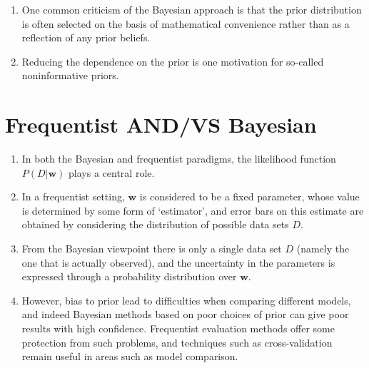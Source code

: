 \begin{enumerate}
    \item One common criticism of the Bayesian approach is that the prior distribution is often selected on the basis of mathematical convenience rather than as a reflection of any prior beliefs.
    \hfill \cite{ml/book/Pattern-Recognition-And-Machine-Learning/Christopher-M-Bishop}

    \item Reducing the dependence on the prior is one motivation for so-called noninformative priors.
    \hfill \cite{ml/book/Pattern-Recognition-And-Machine-Learning/Christopher-M-Bishop}
\end{enumerate}








\section{Frequentist AND/VS Bayesian}

\begin{enumerate}
    \item In both the Bayesian and frequentist paradigms, the likelihood function $P(D|\bm{w})$ plays a central role.
    \hfill \cite{ml/book/Pattern-Recognition-And-Machine-Learning/Christopher-M-Bishop}

    \item In a frequentist setting, $\bm{w}$ is considered to be a fixed parameter, whose value is determined by some form of ‘estimator’, and error bars on this estimate are obtained by considering the distribution of possible data sets $D$.
    \hfill \cite{ml/book/Pattern-Recognition-And-Machine-Learning/Christopher-M-Bishop}

    \item From the Bayesian viewpoint there is only a single data set $D$ (namely the one that is actually observed), and the uncertainty in the parameters is expressed through a probability distribution over $\bm{w}$.
    \hfill \cite{ml/book/Pattern-Recognition-And-Machine-Learning/Christopher-M-Bishop}

    \item However, bias to prior lead to difficulties when comparing different models, and indeed Bayesian methods based on poor choices of prior can give poor results with high confidence.
    Frequentist evaluation methods offer some protection from such problems, and techniques such as cross-validation remain useful in areas such as model comparison.
    \hfill \cite{ml/book/Pattern-Recognition-And-Machine-Learning/Christopher-M-Bishop}


\end{enumerate}








